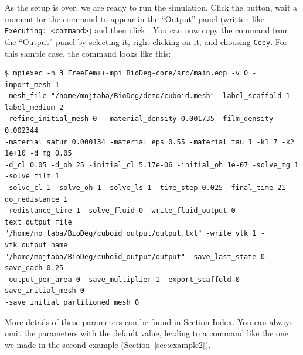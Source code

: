 As the setup is over, we are ready to run the simulation. Click the  button, wait a moment for the command to appear in the ``Output'' panel (written  like \verb|Executing: <command>|) and then click . You can now copy the command from the ``Output'' panel by selecting it, right clicking on it, and choosing \verb|Copy|. For this sample case, the command looks like this:

\begin{verbatim}
$ mpiexec -n 3 FreeFem++-mpi BioDeg-core/src/main.edp -v 0 -import_mesh 1 
-mesh_file "/home/mojtaba/BioDeg/demo/cuboid.mesh" -label_scaffold 1 -label_medium 2 
-refine_initial_mesh 0  -material_density 0.001735 -film_density 0.002344 
-material_satur 0.000134 -material_eps 0.55 -material_tau 1 -k1 7 -k2 1e+10 -d_mg 0.05 
-d_cl 0.05 -d_oh 25 -initial_cl 5.17e-06 -initial_oh 1e-07 -solve_mg 1 -solve_film 1 
-solve_cl 1 -solve_oh 1 -solve_ls 1 -time_step 0.025 -final_time 21 -do_redistance 1  
-redistance_time 1 -solve_fluid 0 -write_fluid_output 0 -text_output_file 
"/home/mojtaba/BioDeg/cuboid_output/output.txt" -write_vtk 1 -vtk_output_name 
"/home/mojtaba/BioDeg/cuboid_output/output" -save_last_state 0 -save_each 0.25 
-output_per_area 0 -save_multiplier 1 -export_scaffold 0  -save_initial_mesh 0 
-save_initial_partitioned_mesh 0
\end{verbatim}

More details of these parameters can be found in Section \hyperref[sec:index]{Index}. You can always omit the parameters with the default value, leading to a command like the one we made in the second example (Section~\ref{sec:example2}).